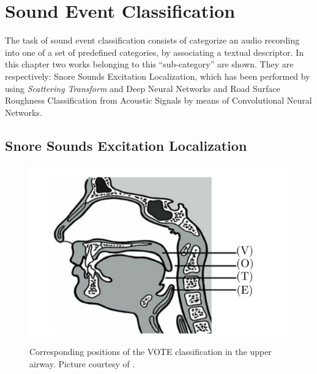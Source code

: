 \chapter{Sound Event Classification}

The task of sound event classification consists of categorize an audio recording into one of a set of predefined categories, by associating a textual descriptor. In this chapter two works belonging to this ``sub-category'' are shown. They are respectively: Snore Sounds Excitation Localization, which has been performed by using \textit{Scattering Transform} and Deep Neural Networks and Road Surface Roughness Classification from Acoustic Signals by means of Convolutional Neural Networks.

\section{Snore Sounds Excitation Localization}

\begin{figure}[h]
	\centering
	\includegraphics[width=0.6\linewidth]{img/vote.pdf}
	\caption[VOTE locations]{Corresponding positions of the VOTE classification in the upper airway. Picture courtesy of \cite{janott2014akustical}.} 
	\label{fig:vote}
\end{figure}

